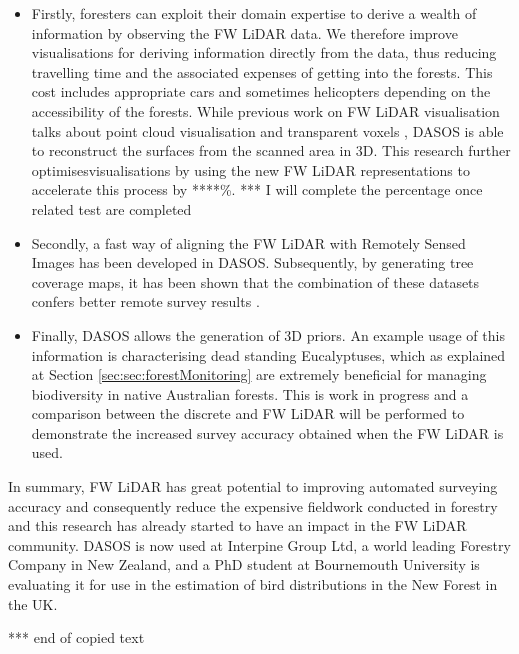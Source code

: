 \documentclass{subfiles}
\begin{document}
\begin{itemize}
\item Firstly, foresters can exploit their domain expertise to derive a wealth of information by observing the FW LiDAR data. We therefore improve visualisations for deriving information directly from the data, thus reducing travelling time and the associated expenses of getting into the forests. This cost includes appropriate cars and sometimes helicopters depending on the accessibility of the forests. While previous work on FW LiDAR visualisation talks about point cloud visualisation \cite{Isenburg2012Pulsewaves} and transparent voxels \cite{Persson2005}, DASOS is able to reconstruct the surfaces from the scanned area in 3D. This research further optimisesvisualisations by using the new FW LiDAR representations to accelerate this process by ****\%. {\color{red} *** I will complete the percentage once related test are completed}

\item Secondly, a fast way of aligning the FW LiDAR with Remotely Sensed Images has been developed in DASOS. Subsequently, by generating tree coverage maps, it has been shown that the combination of these datasets confers better remote survey results \cite{Miltiadou2015}.


\item {\color{gray} Finally, DASOS allows the generation of 3D priors. An example usage of this information is characterising dead standing Eucalyptuses, which as explained at Section \ref{sec:sec:forestMonitoring} are extremely beneficial for managing biodiversity in native Australian forests. This is work in progress and a comparison between the discrete and FW LiDAR will be performed to demonstrate the increased survey accuracy obtained when the FW LiDAR is used.}

\end{itemize}



\par In summary, FW LiDAR has great potential to improving automated surveying accuracy and consequently reduce the expensive fieldwork conducted in forestry and this research has already started to have an impact in the FW LiDAR community. DASOS is now used at Interpine Group Ltd, a world leading Forestry Company in New Zealand, and a PhD student at Bournemouth University is evaluating it for use in the estimation of bird distributions in the New Forest in the UK.

	
	\par {\color{red} *** end of copied text}
	
\end{document}
